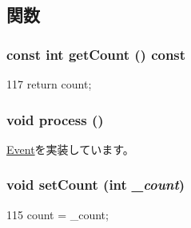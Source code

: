 \subsection{関数}
\hypertarget{classCountedDrainEvent_aa501d80e5abb55d3cf617940e72be67b}{
\subsubsection[{getCount}]{\setlength{\rightskip}{0pt plus 5cm}const int getCount () const}}
\label{classCountedDrainEvent_aa501d80e5abb55d3cf617940e72be67b}



\begin{DoxyCode}
117 { return count; }
\end{DoxyCode}
\hypertarget{classCountedDrainEvent_a2e9c5136d19b1a95fc427e0852deab5c}{
\subsubsection[{process}]{\setlength{\rightskip}{0pt plus 5cm}void process ()}}
\label{classCountedDrainEvent_a2e9c5136d19b1a95fc427e0852deab5c}


\hyperlink{classEvent_a142b75b68a6291400e20fb0dd905b1c8}{Event}を実装しています。\hypertarget{classCountedDrainEvent_a0d3feb8a189bccc5d1de6ab4d59c6af6}{
\subsubsection[{setCount}]{\setlength{\rightskip}{0pt plus 5cm}void setCount (int {\em \_\-count})}}
\label{classCountedDrainEvent_a0d3feb8a189bccc5d1de6ab4d59c6af6}



\begin{DoxyCode}
115 { count = _count; }
\end{DoxyCode}


